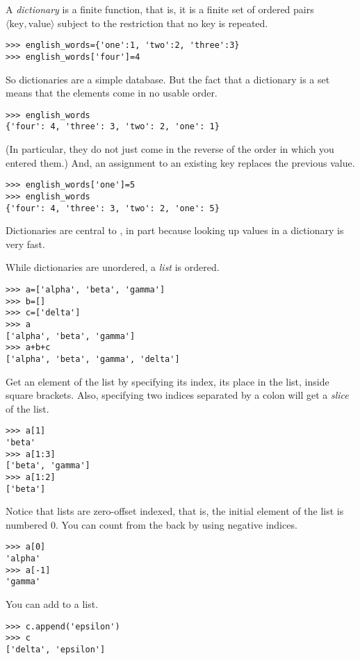 A \python{} \textit{dictionary} is a finite function, that is, it is a finite
set of ordered pairs $\langle\text{key},\text{value}\rangle$ subject 
to the restriction that no key is repeated.
\begin{lstlisting}[style=python]
>>> english_words={'one':1, 'two':2, 'three':3}
>>> english_words['four']=4  
\end{lstlisting}
So dictionaries are a simple database.
But the fact that a dictionary is a set means that the elements come in 
no usable order.
\begin{lstlisting}[style=python]
>>> english_words
{'four': 4, 'three': 3, 'two': 2, 'one': 1}
\end{lstlisting}
(In particular, they do not just come in the reverse of the order
in which you entered them.)
And, an assignment to an existing key replaces the previous value. 
\begin{lstlisting}[style=python]
>>> english_words['one']=5
>>> english_words
{'four': 4, 'three': 3, 'two': 2, 'one': 5}
\end{lstlisting}
Dictionaries are central to \python, in part because looking up values 
in a dictionary is very fast.

While dictionaries are unordered, a \python{} \textit{list} is ordered.
\begin{lstlisting}[style=python]
>>> a=['alpha', 'beta', 'gamma']
>>> b=[]
>>> c=['delta']
>>> a
['alpha', 'beta', 'gamma']
>>> a+b+c
['alpha', 'beta', 'gamma', 'delta']
\end{lstlisting}
Get an element of the list by specifying its index, its place in the list,
inside square brackets.
Also, specifying two indices separated by a colon will get a \textit{slice} 
of the list. 
\begin{lstlisting}[style=python]
>>> a[1]
'beta'
>>> a[1:3]
['beta', 'gamma']
>>> a[1:2]
['beta']
\end{lstlisting}
Notice that lists are zero-offset indexed, that is, the initial element of the
list is numbered $0$.
You can count from the back by using negative indices.
\begin{lstlisting}[style=python]
>>> a[0]
'alpha'
>>> a[-1]
'gamma'
\end{lstlisting}
You can add to a list.
\begin{lstlisting}[style=python]
>>> c.append('epsilon')
>>> c
['delta', 'epsilon']  
\end{lstlisting}

